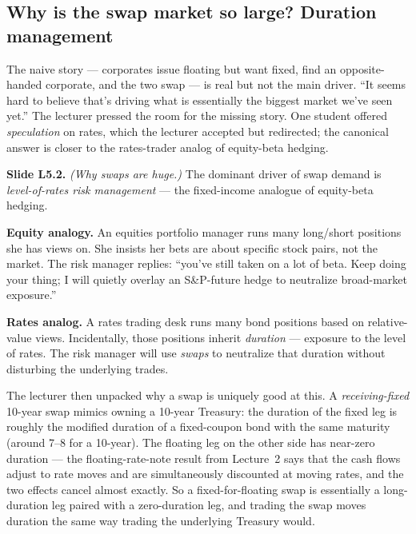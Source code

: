 \subsection{Why is the swap market so large? Duration management}\label{L5-sec:swaps-duration}

The naive story --- corporates issue floating but want fixed, find an
opposite-handed corporate, and the two swap --- is real but not the
main driver. ``It seems hard to believe that's driving what is
essentially the biggest market we've seen yet.'' The lecturer pressed
the room for the missing story. One student offered \emph{speculation}
on rates, which the lecturer accepted but redirected; the canonical
answer is closer to the rates-trader analog of equity-beta hedging.

\begin{keyblock}
\textbf{Slide L5.2.} \emph{(Why swaps are huge.)} The dominant driver
of swap demand is \emph{level-of-rates risk management} --- the
fixed-income analogue of equity-beta hedging.

\textbf{Equity analogy.} An equities portfolio manager runs many
long/short positions she has views on. She insists her bets are
about specific stock pairs, not the market. The risk manager replies:
``you've still taken on a lot of beta. Keep doing your thing; I will
quietly overlay an S\&P-future hedge to neutralize broad-market
exposure.''

\textbf{Rates analog.} A rates trading desk runs many bond positions
based on relative-value views. Incidentally, those positions inherit
\emph{duration} --- exposure to the level of rates. The risk manager
will use \emph{swaps} to neutralize that duration without disturbing
the underlying trades.
\end{keyblock}

The lecturer then unpacked why a swap is uniquely good at this. A
\emph{receiving-fixed} 10-year swap mimics owning a 10-year Treasury:
the duration of the fixed leg is roughly the modified duration of a
fixed-coupon bond with the same maturity (around 7--8 for a 10-year).
The floating leg on the other side has near-zero duration --- the
floating-rate-note result from Lecture~2 says that the cash flows
adjust to rate moves and are simultaneously discounted at moving rates,
and the two effects cancel almost exactly. So a fixed-for-floating
swap is essentially a long-duration leg paired with a zero-duration
leg, and trading the swap moves duration the same way trading the
underlying Treasury would.

